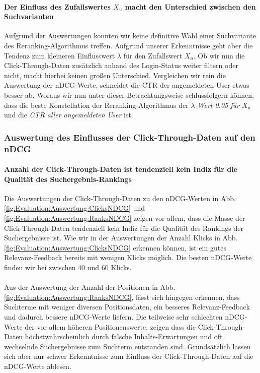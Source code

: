 \paragraph{Der Einfluss des Zufallswertes $X_u$ macht den Unterschied zwischen den Suchvarianten}
Aufgrund der Auswertungen konnten wir keine definitive Wahl einer Suchvariante des Reranking-Algorithmus treffen. Aufgrund unserer Erkenntnisse geht aber die Tendenz zum kleineren Einflusswert $\lambda$ für den Zufallswert $X_u$. Ob wir nun die Click-Through-Daten zusätzlich anhand des Login-Status weiter filtern oder nicht, macht hierbei keinen großen Unterschied. Vergleichen wir rein die Auswertung der nDCG-Werte, schneidet die CTR der angemeldeten User etwas besser ab. Woraus wir nun unter dieser Betrachtungsweise schlussfolgern können, dass die beste Konstellation der Reranking-Algorithmus der \textit{$\lambda$-Wert 0.05 für $X_u$} und die \textit{CTR aller angemeldeten User} ist.

\pagebreak

\subsubsection{Auswertung des Einflusses der Click-Through-Daten auf den nDCG}
\label{sec:Evaluation:Auswertung:Diskussion:EinflussNDCG}

\paragraph{Anzahl der Click-Through-Daten ist tendenziell kein Indiz für die Qualität des Suchergebnis-Rankings}
Die Auswertungen der Click-Through-Daten zu den nDCG-Werten in Abb. \ref{fig:Evaluation:Auswertung:ClicksNDCG} und \ref{fig:Evaluation:Auswertung:RanksNDCG} zeigen vor allem, dass die Masse der Click-Through-Daten tendenziell kein Indiz für die Qualität des Rankings der Suchergebnisse ist. Wie wir in der Auswertungen der Anzahl Klicks in Abb. \ref{fig:Evaluation:Auswertung:ClicksNDCG} erkennen können, ist ein gutes Relevanz-Feedback bereits mit wenigen Klicks möglich. Die besten nDCG-Werte finden wir bei zwischen 40 und 60 Klicks. 
\\
\\
Aus der Auswertung der Anzahl der Positionen in Abb. \ref{fig:Evaluation:Auswertung:RanksNDCG}, lässt sich hingegen erkennen, dass Suchterme mit weniger diversen Positionsdaten, ein besseres Relevanz-Feedback und dadurch bessere nDCG-Werte liefern. Die teilweise sehr schlechten nDCG-Werte der vor allem höheren Positionenswerte, zeigen dass die Click-Through-Daten höchstwahrscheinlich durch falsche Inhalts-Erwartungen und oft wechselnde Suchergebnisse zum Suchterm entstanden sind. Grundsätzlich lassen sich aber nur schwer Erkenntnisse zum Einfluss der Click-Through-Daten auf die nDCG-Werte ablesen.

